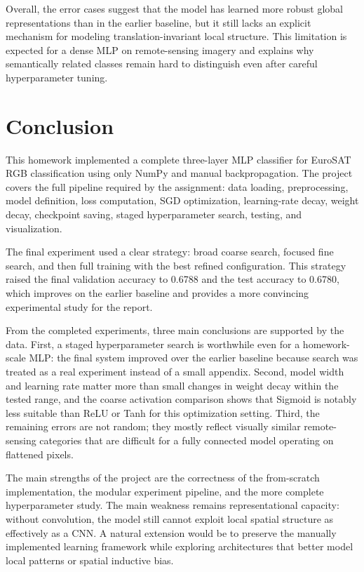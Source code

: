 \documentclass{article}
\begin{document}
Overall, the error cases suggest that the model has learned more robust global representations than in the earlier baseline, but it still lacks an explicit mechanism for modeling translation-invariant local structure. This limitation is expected for a dense MLP on remote-sensing imagery and explains why semantically related classes remain hard to distinguish even after careful hyperparameter tuning.

\section{Conclusion}

This homework implemented a complete three-layer MLP classifier for EuroSAT RGB classification using only NumPy and manual backpropagation. The project covers the full pipeline required by the assignment: data loading, preprocessing, model definition, loss computation, SGD optimization, learning-rate decay, weight decay, checkpoint saving, staged hyperparameter search, testing, and visualization.

The final experiment used a clear strategy: broad coarse search, focused fine search, and then full training with the best refined configuration. This strategy raised the final validation accuracy to 0.6788 and the test accuracy to 0.6780, which improves on the earlier baseline and provides a more convincing experimental study for the report.

From the completed experiments, three main conclusions are supported by the data. First, a staged hyperparameter search is worthwhile even for a homework-scale MLP: the final system improved over the earlier baseline because search was treated as a real experiment instead of a small appendix. Second, model width and learning rate matter more than small changes in weight decay within the tested range, and the coarse activation comparison shows that Sigmoid is notably less suitable than ReLU or Tanh for this optimization setting. Third, the remaining errors are not random; they mostly reflect visually similar remote-sensing categories that are difficult for a fully connected model operating on flattened pixels.

The main strengths of the project are the correctness of the from-scratch implementation, the modular experiment pipeline, and the more complete hyperparameter study. The main weakness remains representational capacity: without convolution, the model still cannot exploit local spatial structure as effectively as a CNN. A natural extension would be to preserve the manually implemented learning framework while exploring architectures that better model local patterns or spatial inductive bias.
\end{document}
